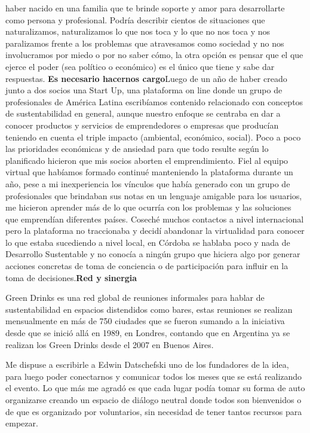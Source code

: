 \begin{fullwidth}
haber nacido en una familia que te brinde soporte y amor para
desarrollarte como persona y profesional. Podría describir cientos de
situaciones que naturalizamos, naturalizamos lo que nos toca y lo que no
nos toca y nos paralizamos frente a los problemas que atravesamos como
sociedad y no nos involucramos por miedo o por no saber cómo, la otra
opción es pensar que el que ejerce el poder (sea político o económico)
es el único que tiene y sabe dar respuestas. \textbf{Es necesario
hacernos cargo}Luego de un año de haber creado junto a dos socios una
Start Up, una plataforma on line donde un grupo de profesionales de
América Latina escribíamos contenido relacionado con conceptos de
sustentabilidad en general, aunque nuestro enfoque se centraba en dar a
conocer productos y servicios de emprendedores o empresas que producían
teniendo en cuenta el triple impacto (ambiental, económico, social).
Poco a poco las prioridades económicas y de ansiedad para que todo
resulte según lo planificado hicieron que mis socios aborten el
emprendimiento. Fiel al equipo virtual que habíamos formado continué
manteniendo la plataforma durante un año, pese a mi inexperiencia los
vínculos que había generado con un grupo de profesionales que brindaban
sus notas en un lenguaje amigable para los usuarios, me hicieron
aprender más de lo que ocurría con los problemas y las soluciones que
emprendían diferentes países. Coseché muchos contactos a nivel
internacional pero la plataforma no traccionaba y decidí abandonar la
virtualidad para conocer lo que estaba sucediendo a nivel local, en
Córdoba se hablaba poco y nada de Desarrollo Sustentable y no conocía a
ningún grupo que hiciera algo por generar acciones concretas de toma de
conciencia o de participación para influir en la toma de
decisiones.\textbf{Red y sinergia}

Green Drinks es una red global de reuniones informales para hablar de
sustentabilidad en espacios distendidos como bares, estas reuniones se
realizan mensualmente en más de 750 ciudades que se fueron sumando a la
iniciativa desde que se inició allá en 1989, en Londres, contando que en
Argentina ya se realizan los Green Drinks desde el 2007 en Buenos Aires.

Me dispuse a escribirle a Edwin Datschefski uno de los fundadores de la
idea, para luego poder conectarnos y comunicar todos los meses que se
está realizando el evento. Lo que más me agradó es que cada lugar podía
tomar su forma de auto organizarse creando un espacio de diálogo neutral
donde todos son bienvenidos o de que es organizado por voluntarios, sin
necesidad de tener tantos recursos para empezar.


\end{fullwidth}
